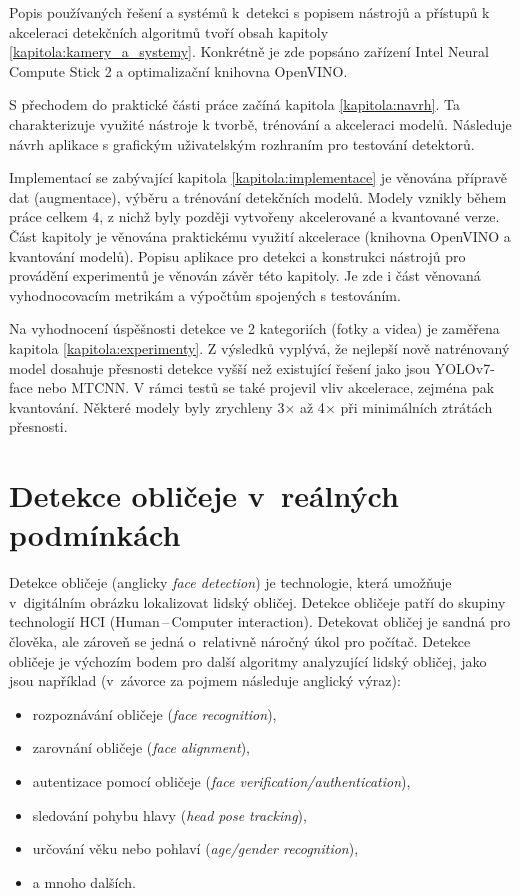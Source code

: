 Popis používaných řešení a systémů k~detekci s popisem nástrojů a přístupů k akceleraci detekčních algoritmů tvoří obsah kapitoly \ref{kapitola:kamery_a_systemy}. Konkrétně je zde popsáno zařízení Intel Neural Compute Stick 2 a optimalizační knihovna OpenVINO.

S přechodem do praktické části práce začíná kapitola \ref{kapitola:navrh}. Ta charakterizuje využité nástroje k tvorbě, trénování a akceleraci modelů. Následuje návrh aplikace s grafickým uživatelským rozhraním pro testování detektorů. 

Implementací se zabývající kapitola \ref{kapitola:implementace} je věnována přípravě dat (augmentace), výběru a trénování detekčních modelů. Modely vznikly během práce celkem 4, z nichž byly později vytvořeny akcelerované a kvantované verze. Část kapitoly je věnována praktickému využití akcelerace (knihovna OpenVINO a kvantování modelů). Popisu aplikace pro detekci a konstrukci nástrojů pro provádění experimentů je věnován závěr této kapitoly. Je zde i část věnovaná vyhodnocovacím metrikám a výpočtům spojených s testováním.

Na vyhodnocení úspěšnosti detekce ve 2 kategoriích (fotky a videa) je zaměřena kapitola \ref{kapitola:experimenty}. Z výsledků vyplývá, že nejlepší nově natrénovaný model dosahuje přesnosti detekce vyšší než existující řešení jako jsou YOLOv7-face nebo MTCNN. V rámci testů se také projevil vliv akcelerace, zejména pak kvantování. Některé modely byly zrychleny 3$\times$ až 4$\times$ při minimálních ztrátách přesnosti.



\chapter{Detekce obličeje v~reálných podmínkách}
\label{kapitola:detekce_obliceje}
Detekce obličeje (anglicky \emph{face detection}) \cite{fdReview, frReview} je technologie, která umožňuje v~digitálním obrázku lokalizovat lidský obličej. Detekce obličeje patří do skupiny technologií HCI (Human\,--\,Computer interaction).
Detekovat obličej je sandná pro člověka, ale zároveň se jedná o~relativně náročný úkol pro počítač.
Detekce obličeje je výchozím bodem pro další algoritmy analyzující lidský obličej, jako jsou například (v~závorce za pojmem následuje anglický výraz):
\begin{itemize}
  \item rozpoznávání obličeje (\emph{face recognition}),
  \item zarovnání obličeje (\emph{face alignment}),
  \item autentizace pomocí obličeje (\emph{face verification/authentication}),
  \item sledování pohybu hlavy (\emph{head pose tracking}),
  \item určování věku nebo pohlaví (\emph{age/gender recognition}),
  \item[] a mnoho dalších. 
\end{itemize}

